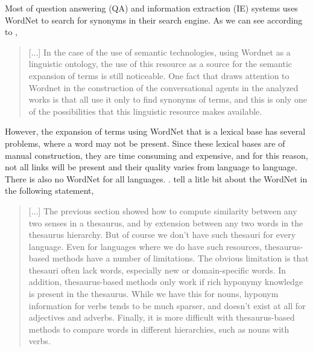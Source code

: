 Most of question answering (QA) and information extraction (IE) systems uses WordNet to search for synonyms in their search engine. As we can see according to , 
\begin{quote}
    [...] In the case of the use of semantic technologies, using Wordnet as a linguistic ontology, the use of this resource as a source for the semantic expansion of terms is still noticeable. One fact that draws attention to Wordnet in the construction of the conversational agents in the analyzed works is that all use it only to find synonyms of terms, and this is only one of the possibilities that this linguistic resource makes available.
\end{quote}

However, the expansion of terms using WordNet that is a lexical base has several problems, where a word may not be present. Since these lexical bases are of manual construction, they are time consuming and expensive, and for this reason, not all links will be present and their quality varies from language to language. There is also no WordNet for all languages. \cite{Leeuwenberga2016}.  tell a litle bit about the WordNet in the following statement,
\begin{quote}
    [...]
    The previous section showed how to compute similarity between any two senses in a thesaurus, and by extension between any two words in the thesaurus hierarchy. But of course we don't have such thesauri for every language. Even for languages where we do have such resources, thesaurus-based methods have a number of limitations. The obvious limitation is that thesauri often lack words, especially new or domain-specific words. In addition, thesaurus-based methods only work if rich hyponymy knowledge is present in the thesaurus. While we have this for nouns, hyponym information for verbs tends to be much sparser, and doesn't exist at all for adjectives and adverbs. Finally, it is more difficult with thesaurus-based methods to compare words in different hierarchies, such as nouns with verbs.
\end{quote}

